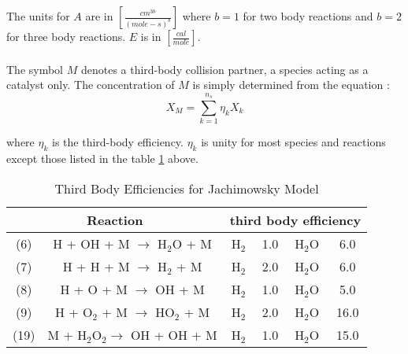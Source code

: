 The units for $A$ are in $[\frac{cm^{3b}}{(mole-s)^b}]$ where $b=1$ for two body reactions and 
$b=2$ for three body reactions. $E$ is in $[\frac{cal}{mole}]$.\\
\\

The symbol $M$ denotes a third-body collision partner, a species acting as a catalyst only.
The concentration of $M$ is simply determined from the equation :\\

\begin{displaymath}
X_M = \sum_{k=1}^{n_s} \eta_k X_k
\end{displaymath}
\clearpage

where $\eta_k$ is the third-body efficiency. $\eta_k$ is unity
for most species and reactions except those listed in the table 
\ref{thirds} above.

\vspace*{-3cm}
\begin{table}
\begin{threeparttable}
\caption{Third Body Efficiencies for Jachimowsky Model}
\begin{tabular}{|cc|cccc|} \hline
\multicolumn{2}{|c|}{Reaction} & \multicolumn{4}{|c|}{third body efficiency} \\ \hline \hline
(6) & H + OH + M $\rightarrow$ H$_{2}$O + M & H$_{2}$ & 1.0 & H$_{2}$O & 6.0 \\
(7) & H + H + M $\rightarrow$ H$_{2}$ + M & H$_{2}$ & 2.0 & H$_{2}$O & 6.0 \\
(8) & H + O + M $\rightarrow$ OH + M & H$_{2}$ & 1.0 & H$_{2}$O & 5.0 \\
(9) & H + O$_{2}$ + M $\rightarrow$ HO$_{2}$ + M & H$_{2}$ & 2.0 & H$_{2}$O & 16.0 \\
(19) & M + H$_{2}$O$_{2} \rightarrow$ OH + OH + M & H$_{2}$ & 1.0 & H$_{2}$O & 15.0 \\
\hline
\end{tabular}
\label{thirds}
\end{threeparttable}
\end{table}



